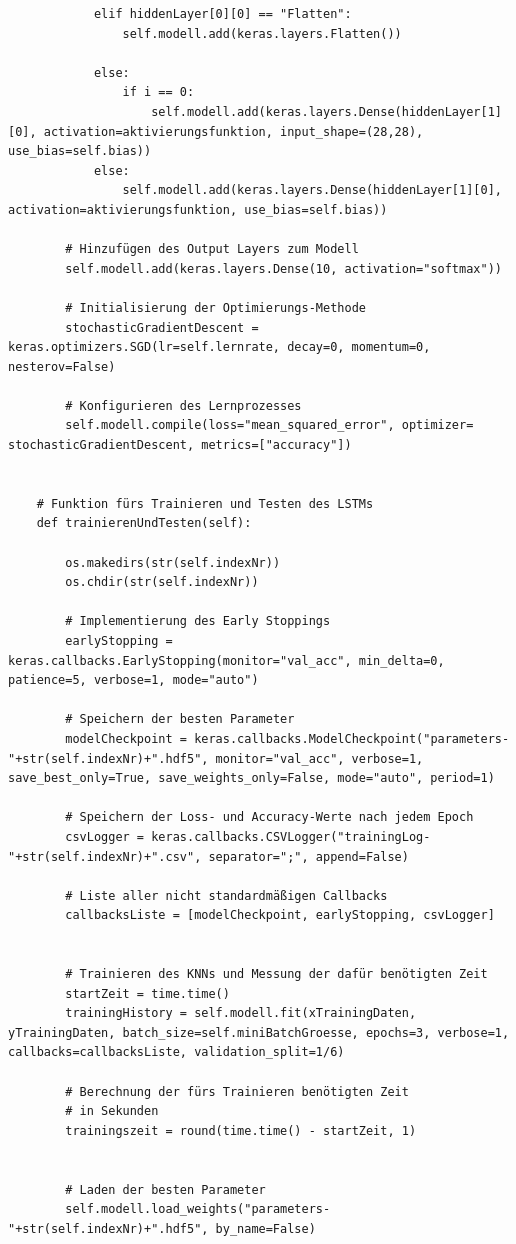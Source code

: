 \documentclass[a4paper,12pt,ngerman,oneside]{scrreprt}	%
\begin{document}
{\begin{lstlisting}
			elif hiddenLayer[0][0] == "Flatten":
				self.modell.add(keras.layers.Flatten())
			
			else:
				if i == 0:
					self.modell.add(keras.layers.Dense(hiddenLayer[1][0], activation=aktivierungsfunktion, input_shape=(28,28), use_bias=self.bias))
			else:
				self.modell.add(keras.layers.Dense(hiddenLayer[1][0], activation=aktivierungsfunktion, use_bias=self.bias))
		
		# Hinzufügen des Output Layers zum Modell
		self.modell.add(keras.layers.Dense(10, activation="softmax"))
		
		# Initialisierung der Optimierungs-Methode
		stochasticGradientDescent = keras.optimizers.SGD(lr=self.lernrate, decay=0, momentum=0, nesterov=False)
		
		# Konfigurieren des Lernprozesses
		self.modell.compile(loss="mean_squared_error", optimizer= stochasticGradientDescent, metrics=["accuracy"])
	
	
	# Funktion fürs Trainieren und Testen des LSTMs
	def trainierenUndTesten(self):
	
		os.makedirs(str(self.indexNr))
		os.chdir(str(self.indexNr))
		
		# Implementierung des Early Stoppings
		earlyStopping = keras.callbacks.EarlyStopping(monitor="val_acc", min_delta=0, patience=5, verbose=1, mode="auto")
		
		# Speichern der besten Parameter
		modelCheckpoint = keras.callbacks.ModelCheckpoint("parameters-"+str(self.indexNr)+".hdf5", monitor="val_acc", verbose=1, save_best_only=True, save_weights_only=False, mode="auto", period=1)
		
		# Speichern der Loss- und Accuracy-Werte nach jedem Epoch
		csvLogger = keras.callbacks.CSVLogger("trainingLog-"+str(self.indexNr)+".csv", separator=";", append=False)
		
		# Liste aller nicht standardmäßigen Callbacks
		callbacksListe = [modelCheckpoint, earlyStopping, csvLogger]
		
		
		# Trainieren des KNNs und Messung der dafür benötigten Zeit
		startZeit = time.time()
		trainingHistory = self.modell.fit(xTrainingDaten, yTrainingDaten, batch_size=self.miniBatchGroesse, epochs=3, verbose=1, callbacks=callbacksListe, validation_split=1/6)
		
		# Berechnung der fürs Trainieren benötigten Zeit
		# in Sekunden
		trainingszeit = round(time.time() - startZeit, 1)
		
		
		# Laden der besten Parameter
		self.modell.load_weights("parameters-"+str(self.indexNr)+".hdf5", by_name=False)
		

\end{lstlisting}}
\end{document}

